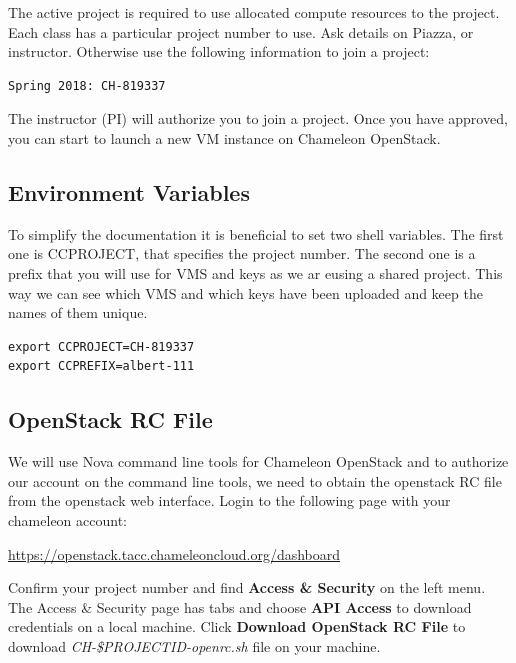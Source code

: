 The active project is required to use allocated compute resources to
the project.  Each class has a particular project number to use. Ask
details on Piazza, or instructor. Otherwise use the following
information to join a project:

\begin{lstlisting}
Spring 2018: CH-819337
\end{lstlisting}

The instructor (PI) will authorize you to join a project. Once you
have approved, you can start to launch a new VM instance on Chameleon
OpenStack.

\subsection{Environment Variables}

To simplify the documentation it is beneficial to set two shell
variables. The first one is CCPROJECT, that specifies the project
number.
The second one is a prefix that you will use for VMS and keys as we ar
eusing a shared project. This way we can see which VMS and which keys
have been uploaded and keep the names of them unique.

\begin{lstlisting}
export CCPROJECT=CH-819337
export CCPREFIX=albert-111
\end{lstlisting}



\subsection{OpenStack RC File}

We will use Nova command line tools for Chameleon OpenStack and to
authorize our account on the command line tools, we need to obtain the
openstack RC file from the openstack web interface. Login to the
following page with your chameleon account:


\url{https://openstack.tacc.chameleoncloud.org/dashboard}

Confirm your project number and find \textbf{Access \& Security} on
the left menu.  The Access \& Security page has tabs and choose
\textbf{API Access} to download credentials on a local machine. Click
\textbf{Download OpenStack RC File} to download
\textit{CH-\$PROJECTID-openrc.sh} file on your machine.


